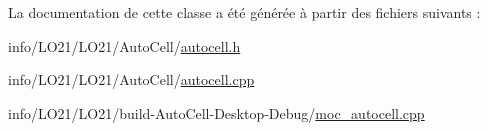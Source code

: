 La documentation de cette classe a été générée à partir des fichiers suivants \+:\begin{DoxyCompactItemize}
\item 
info/\+L\+O21/\+L\+O21/\+Auto\+Cell/\hyperlink{autocell_8h}{autocell.\+h}\item 
info/\+L\+O21/\+L\+O21/\+Auto\+Cell/\hyperlink{autocell_8cpp}{autocell.\+cpp}\item 
info/\+L\+O21/\+L\+O21/build-\/\+Auto\+Cell-\/\+Desktop-\/\+Debug/\hyperlink{moc__autocell_8cpp}{moc\+\_\+autocell.\+cpp}\end{DoxyCompactItemize}
